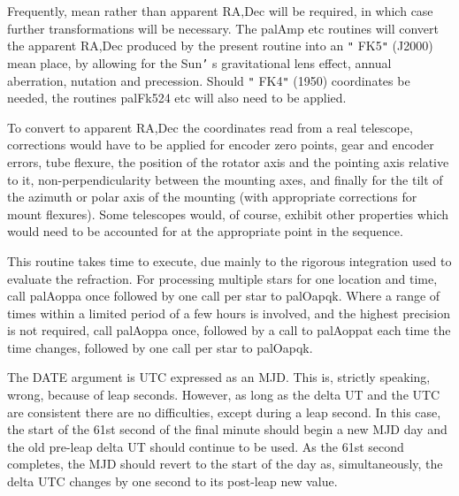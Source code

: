 \documentclass[twoside,11pt,nolof]{starlink}
\begin{document}
{{{         \sstitem
          Frequently, mean rather than apparent RA,Dec will be required,
         in which case further transformations will be necessary.  The
         palAmp etc routines will convert the apparent RA,Dec produced
         by the present routine into an \texttt{"} FK5\texttt{"}  (J2000) mean place, by
         allowing for the Sun\texttt{'} s gravitational lens effect, annual
         aberration, nutation and precession.  Should \texttt{"} FK4\texttt{"}  (1950)
         coordinates be needed, the routines palFk524 etc will also
         need to be applied.

         \sstitem
          To convert to apparent RA,Dec the coordinates read from a
         real telescope, corrections would have to be applied for
         encoder zero points, gear and encoder errors, tube flexure,
         the position of the rotator axis and the pointing axis
         relative to it, non-perpendicularity between the mounting
         axes, and finally for the tilt of the azimuth or polar axis
         of the mounting (with appropriate corrections for mount
         flexures).  Some telescopes would, of course, exhibit other
         properties which would need to be accounted for at the
         appropriate point in the sequence.

         \sstitem
          This routine takes time to execute, due mainly to the rigorous
         integration used to evaluate the refraction.  For processing
         multiple stars for one location and time, call palAoppa once
         followed by one call per star to palOapqk.  Where a range of
         times within a limited period of a few hours is involved, and the
         highest precision is not required, call palAoppa once, followed
         by a call to palAoppat each time the time changes, followed by
         one call per star to palOapqk.

         \sstitem
          The DATE argument is UTC expressed as an MJD.  This is, strictly
         speaking, wrong, because of leap seconds.  However, as long as
         the delta UT and the UTC are consistent there are no
         difficulties, except during a leap second.  In this case, the
         start of the 61st second of the final minute should begin a new
         MJD day and the old pre-leap delta UT should continue to be used.
         As the 61st second completes, the MJD should revert to the start
         of the day as, simultaneously, the delta UTC changes by one
         second to its post-leap new value.

}}}
\end{document}
